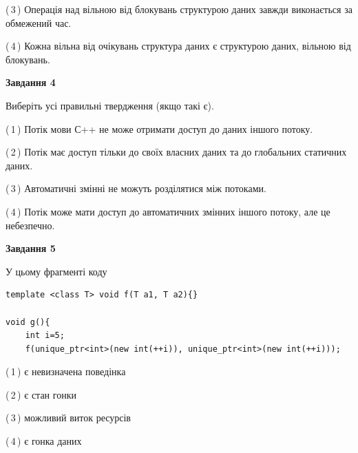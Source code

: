 \documentclass[12pt, ukrainian]{article}
\begin{document}
\begin {large}
{(\,3\,) Операція над вільною від блокувань структурою даних завжди виконається за обмежений час.%

(\,4\,) Кожна вільна від очікувань структура даних є структурою даних, вільною від блокувань.%



\begin{center}
\textbf{Завдання 4}
\end{center}
Виберіть усі правильні твердження (якщо такі є).\par
\vspace{2mm}

(\,1\,) Потік мови С++ не може отримати доступ до даних іншого потоку.%

(\,2\,) Потік має доступ тільки до своїх власних даних та до глобальних статичних даних.%

(\,3\,) Автоматичні змінні не можуть розділятися між потоками.%

(\,4\,) Потік може мати доступ до автоматичних змінних іншого потоку, але це небезпечно.%



\begin{center}
\textbf{Завдання 5}
\end{center}
У цьому фрагменті коду
\begin{verbatim}
template <class T> void f(T a1, T a2){}

void g(){
    int i=5;
    f(unique_ptr<int>(new int(++i)), unique_ptr<int>(new int(++i)));
\end{verbatim}

(\,1\,) є невизначена поведінка%

(\,2\,) є стан гонки%

(\,3\,) можливий виток ресурсів%

(\,4\,) є гонка даних%


}
\end {large}
\end{document}
